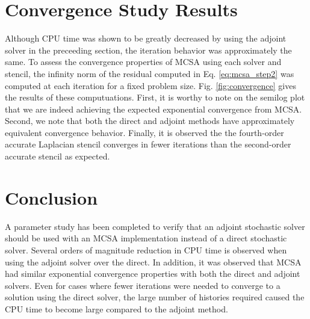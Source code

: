 \documentclass[note]{TechNote}
\begin{document}
\section{Convergence Study Results}
Although CPU time was shown to be greatly decreased by using the
adjoint solver in the preceeding section, the iteration behavior was
approximately the same. To assess the convergence properties of MCSA
using each solver and stencil, the infinity norm of the residual
computed in Eq. \ref{eq:mcsa_step2} was computed at each iteration for
a fixed problem size. Fig. \ref{fig:convergence} gives the results of
these computuations. First, it is worthy to note on the semilog plot
that we are indeed achieving the expected exponential convergence from
MCSA. Second, we note that both the direct and adjoint methods have
approximately equivalent convergence behavior. Finally, it is observed
the the fourth-order accurate Laplacian stencil converges in fewer
iterations than the second-order accurate stencil as expected.

\section{Conclusion}
A parameter study has been completed to verify that an adjoint
stochastic solver should be used with an MCSA implementation instead
of a direct stochastic solver. Several orders of magnitude reduction
in CPU time is observed when using the adjoint solver over the
direct. In addition, it was observed that MCSA had similar exponential
convergence properties with both the direct and adjoint solvers. Even
for cases where fewer iterations were needed to converge to a solution
using the direct solver, the large number of histories required caused
the CPU time to become large compared to the adjoint method.


% 
% 

\closing
\caution
\end{document}
